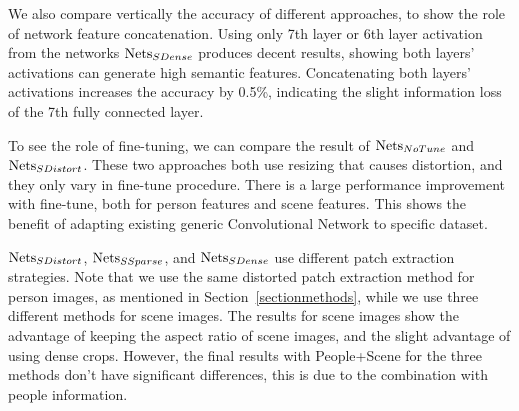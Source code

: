 \documentclass[10pt,twocolumn,letterpaper]{article}
\begin{document}
We also compare vertically the accuracy of different approaches, to show the role of  network feature concatenation. Using only 7th layer or 6th layer activation from the networks $\textup{Nets}_{SDense}$ produces decent results, showing both layers' activations can generate high semantic features. Concatenating both layers' activations increases the accuracy by 0.5\%, indicating the slight information loss of the 7th fully connected layer. 

To see the role of fine-tuning, we can compare the result of $\textup{Nets}_{NoTune}$  and $\textup{Nets}_{SDistort}$. These two approaches both use resizing that causes distortion, and they only vary in fine-tune procedure. There is a large performance improvement with fine-tune, both for person features and scene features. This shows the benefit of adapting existing generic Convolutional Network to specific dataset. 


$\textup{Nets}_{SDistort}$, $\textup{Nets}_{SSparse}$, and $\textup{Nets}_{SDense}$ use different patch extraction strategies. Note that we use the same distorted patch extraction method for person images, as mentioned in Section~\ref{sectionmethods}, while we use three different methods for scene images. The results for scene images show the advantage of keeping the aspect ratio of scene images, and the slight advantage of using dense crops. However, the final results with People+Scene for the three methods don't have significant differences, this is due to the combination with people information. 

\end{document}
